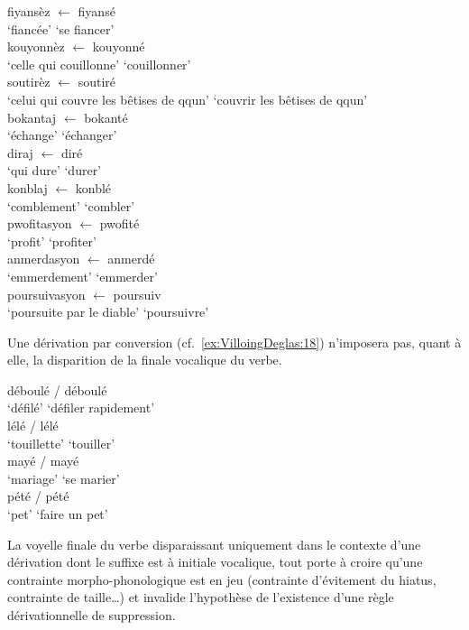 \documentclass[output=paper]{langsci/langscibook}
\begin{document}
\ea\label{ex:VilloingDeglas:15}
  \ea \gll fiyansèz $\leftarrow$ fiyansé \\
  {`fiancée'} {} {`se fiancer'}\\
  \ex \gll kouyonnèz $\leftarrow$ kouyonné \\
  {`celle qui couillonne'} {} {`couillonner'}\\
  \ex \gll soutirèz $\leftarrow$ soutiré \\
  {`celui qui couvre les bêtises de qqun'} {} {`couvrir les bêtises de qqun'}\\
  \z
\ex\label{ex:VilloingDeglas:16}
  \ea \gll bokantaj $\leftarrow$ bokanté \\
  {`échange'} {} {`échanger'}\\
  \ex \gll diraj $\leftarrow$ diré \\
  {`qui dure'} {} {`durer'}\\
  \ex \gll konblaj $\leftarrow$ konblé \\
  {`comblement'} {} {`combler'}\\
  \z
\ex\label{ex:VilloingDeglas:17}
  \ea \gll pwofitasyon $\leftarrow$ pwofité \\
  {`profit'} {} {`profiter'}\\
  \ex \gll anmerdasyon $\leftarrow$ anmerdé \\
  {`emmerdement'} {} {`emmerder'}\\
  \ex \gll poursuivasyon $\leftarrow$ poursuiv \\
  {`poursuite par le diable'} {} {`poursuivre'}\\
  \z
\z

Une dérivation par conversion (cf.~\ref{ex:VilloingDeglas:18}) n'imposera pas, quant à elle, la
disparition de la finale vocalique du verbe.

\ea\label{ex:VilloingDeglas:18}
  \ea \gll déboulé / déboulé \\
  {`défilé'} {} {`défiler rapidement'}\\
  \ex \gll lélé / lélé \\
  {`touillette'} {} {`touiller'}\\
  \ex \gll mayé / mayé \\
  {`mariage'} {} {`se marier'}\\
  \ex \gll pété / pété \\
  {`pet'} {} {`faire un pet'}\\
  \z
\z


La voyelle finale du verbe disparaissant uniquement dans le contexte
d'une dérivation dont le suffixe est à initiale vocalique, tout porte à
croire qu'une contrainte morpho-phonologique est en jeu (contrainte
d'évitement du hiatus, contrainte de taille\ldots{}) et invalide
l'hypothèse de l'existence d'une règle dérivationnelle de suppression.
\end{document}
